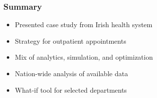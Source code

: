 



\begin{frame}
\frametitle{Summary}
\begin{itemize}
\item Presented case study from Irish health system
\item Strategy for outpatient appointments
\item Mix of analytics, simulation, and optimization
\item Nation-wide analysis of available data
\item What-if tool for selected departments
\end{itemize}
\end{frame}


